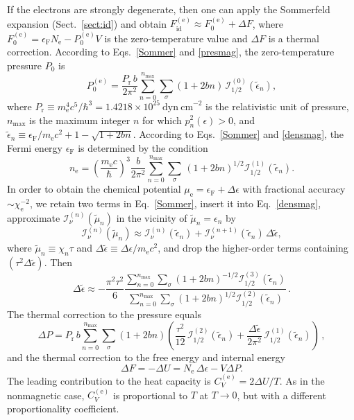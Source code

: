 \documentclass[traditabstract]{aa}
\newcommand{\beq}{\begin{equation}}
\newcommand{\eeq}{\end{equation}}
\newcommand{\req}[1]{Eq.~\ref{#1}}
\newcommand{\chie}{\chi_\mathrm{e}}
\newcommand{\EF}{\epsilon_\mathrm{F}}
\newcommand{\mel}{m_\mathrm{e}}
\newcommand{\nel}{n_\mathrm{e}}
\newcommand{\mue}{\mu_\mathrm{e}}
\newcommand{\Nel}{N_\mathrm{e}}
\newcommand{\Prel}{P_\mathrm{r}}
\begin{document}
If the electrons are strongly degenerate, then one can apply
the Sommerfeld expansion (Sect.~\ref{sect:id}) and obtain
$F_\mathrm{id}^\mathrm{(e)} \approx F_0^\mathrm{(e)} +\Delta
F$, where $F_0^\mathrm{(e)} = \EF \Nel -P_0^\mathrm{(e)} V$
is the zero-temperature value and $\Delta F$ is a thermal
correction. According to Eqs.~\ref{Sommer} and
\ref{presmag}, the zero-temperature pressure $P_0$ is
\beq
   P_0^\mathrm{(e)} = \frac{\Prel\, b}{2\pi^2}
      \sum_{n=0}^{n_\mathrm{max}} \sum_\sigma
       (1+2bn)\,
      \mathcal{I}_{1/2}^{(0)}(\tilde\epsilon_n),
\eeq
where $\Prel \equiv \mel^4 c^5/\hbar^3 = 1.4218\times %
10^{25}\mathrm{~dyn~cm}^{-2}$ is the relativistic unit of
pressure, $n_\mathrm{max}$ is the maximum integer $n$ for
which $p_n^2(\epsilon)>0$, and
$\tilde\epsilon_n\equiv\EF/\mel c^2+1-\sqrt{1+2bn}$.
According to Eqs.~\ref{Sommer} and \ref{densmag}, the
Fermi energy $\EF$ is determined by the condition
\beq
   \nel = \left(\frac{\mel c}{\hbar}\right)^{3}
   \frac{b}{2\pi^2} \sum_{n=0}^{n_\mathrm{max}} \sum_\sigma
   \,(1+2bn)^{1/2}
    \mathcal{I}_{1/2}^{(1)}(\tilde\epsilon_n).
\label{n_e_deg}
\eeq
In order to obtain the chemical potential
$
   \mue = \EF + \Delta\epsilon
$
with fractional accuracy $\sim\chie^{-2}$, 
we retain two terms
in \req{Sommer}, 
insert it into \req{densmag},
approximate
$\mathcal{I}_\nu^{(n)}(\tilde\mu_n)$
in the vicinity of
$\tilde\mu_n=\epsilon_n$ by
\beq
\mathcal{I}_\nu^{(n)}(\tilde\mu_n)\approx
\mathcal{I}_\nu^{(n)}(\tilde\epsilon_n)
+\mathcal{I}_\nu^{(n+1)}(\tilde\epsilon_n)\,\Delta\tilde\epsilon ,
\label{Inu1}
\eeq
where $\tilde\mu_n\equiv\chi_n\tau$
and $\Delta\tilde\epsilon\equiv\Delta\epsilon/\mel c^2$,
and drop the higher-order terms containing
$(\tau^2\Delta\tilde\epsilon)$. Then
\beq
  \Delta\tilde\epsilon
   \approx
   - \frac{\pi^2\tau^2}{6}
   \frac{\sum_{n=0}^{n_\mathrm{max}} \sum_\sigma
     (1+2bn)^{-1/2}\mathcal{I}_{1/2}^{(3)}(\tilde\epsilon_n)
   }{\sum_{n=0}^{n_\mathrm{max}} \sum_\sigma
     (1+2bn)^{1/2}\mathcal{I}_{1/2}^{(2)}(\tilde\epsilon_n)
   } \,.
\label{DeltaE}
\eeq
The thermal correction to the pressure equals
\beq
   \Delta P = \Prel\, b
     \sum_{n=0}^{n_\mathrm{max}} \sum_\sigma
      (1+2bn) \left(
        \frac{\tau^2}{12}\,\mathcal{I}_{1/2}^{(2)}(\tilde\epsilon_n)
     + \frac{\Delta\tilde\epsilon}{2\pi^2}
      \,\mathcal{I}_{1/2}^{(1)}(\tilde\epsilon_n)
         \right)\,,
\label{DeltaP}
\eeq
and the thermal correction to the free energy and internal
energy
\beq
 \Delta F = - \Delta U
    = \Nel\, \Delta\epsilon - V \Delta P.
\label{DeltaU}
\eeq
The leading contribution to the heat capacity 
is $C_V^\mathrm{(e)} = 2\Delta U/T$. As
in the nonmagnetic case, $C_V^\mathrm{(e)}$ is
proportional to $T$ at $T\to0$, but with a different
proportionality coefficient.
\end{document}
